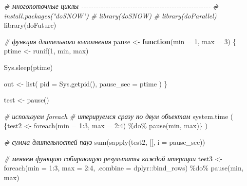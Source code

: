 \documentclass[
]{book}
\newenvironment{Shaded}{\begin{snugshade}}{\end{snugshade}}
\newcommand{\AttributeTok}[1]{\textcolor[rgb]{0.77,0.63,0.00}{#1}}
\newcommand{\CommentTok}[1]{\textcolor[rgb]{0.56,0.35,0.01}{\textit{#1}}}
\newcommand{\ControlFlowTok}[1]{\textcolor[rgb]{0.13,0.29,0.53}{\textbf{#1}}}
\newcommand{\DecValTok}[1]{\textcolor[rgb]{0.00,0.00,0.81}{#1}}
\newcommand{\FunctionTok}[1]{\textcolor[rgb]{0.00,0.00,0.00}{#1}}
\newcommand{\NormalTok}[1]{#1}
\newcommand{\OtherTok}[1]{\textcolor[rgb]{0.56,0.35,0.01}{#1}}
\newcommand{\SpecialCharTok}[1]{\textcolor[rgb]{0.00,0.00,0.00}{#1}}
\newcommand{\StringTok}[1]{\textcolor[rgb]{0.31,0.60,0.02}{#1}}
\begin{document}
\begin{Shaded}
\begin{Highlighting}[]
\CommentTok{\# многопоточные циклы {-}{-}{-}{-}{-}{-}{-}{-}{-}{-}{-}{-}{-}{-}{-}{-}{-}{-}{-}{-}{-}{-}{-}{-}{-}{-}{-}{-}{-}{-}{-}{-}{-}{-}{-}{-}{-}{-}{-}{-}{-}{-}{-}{-}{-}{-}{-}{-}{-}{-}{-}{-}{-}}
\CommentTok{\# install.packages("doSNOW")}
\CommentTok{\# library(doSNOW)}
\CommentTok{\# library(doParallel)}
\FunctionTok{library}\NormalTok{(doFuture)}

\CommentTok{\# функция длительного выполнения}
\NormalTok{pause }\OtherTok{\textless{}{-}} \ControlFlowTok{function}\NormalTok{(}\AttributeTok{min =} \DecValTok{1}\NormalTok{, }\AttributeTok{max =} \DecValTok{3}\NormalTok{) \{}
\NormalTok{  ptime }\OtherTok{\textless{}{-}} \FunctionTok{runif}\NormalTok{(}\DecValTok{1}\NormalTok{, min, max)}

  \FunctionTok{Sys.sleep}\NormalTok{(ptime)}

\NormalTok{  out }\OtherTok{\textless{}{-}} \FunctionTok{list}\NormalTok{(}
    \AttributeTok{pid =} \FunctionTok{Sys.getpid}\NormalTok{(),}
    \AttributeTok{pause\_sec =}\NormalTok{ ptime}
\NormalTok{  )}
\NormalTok{\}}

\NormalTok{test }\OtherTok{\textless{}{-}} \FunctionTok{pause}\NormalTok{()}

\CommentTok{\# используем foreach }
\CommentTok{\# итерируемся сразу по двум объектам}
\FunctionTok{system.time}\NormalTok{ (}
\NormalTok{  \{test2 }\OtherTok{\textless{}{-}} \FunctionTok{foreach}\NormalTok{(}\AttributeTok{min =} \DecValTok{1}\SpecialCharTok{:}\DecValTok{3}\NormalTok{, }\AttributeTok{max =} \DecValTok{2}\SpecialCharTok{:}\DecValTok{4}\NormalTok{) }\SpecialCharTok{\%do\%} \FunctionTok{pause}\NormalTok{(min, max)\}}
\NormalTok{)}

\CommentTok{\# сумма длительностей пауз}
\FunctionTok{sum}\NormalTok{(}\FunctionTok{sapply}\NormalTok{(test2, }\StringTok{\textquotesingle{}[[\textquotesingle{}}\NormalTok{, }\AttributeTok{i =} \StringTok{\textquotesingle{}pause\_sec\textquotesingle{}}\NormalTok{))}

\CommentTok{\# меняем функцию собирающую результаты каждой итерации}
\NormalTok{test3 }\OtherTok{\textless{}{-}} \FunctionTok{foreach}\NormalTok{(}\AttributeTok{min =} \DecValTok{1}\SpecialCharTok{:}\DecValTok{3}\NormalTok{, }\AttributeTok{max =} \DecValTok{2}\SpecialCharTok{:}\DecValTok{4}\NormalTok{, }\AttributeTok{.combine =}\NormalTok{ dplyr}\SpecialCharTok{::}\NormalTok{bind\_rows) }\SpecialCharTok{\%do\%} \FunctionTok{pause}\NormalTok{(min, max)}


\end{Highlighting}
\end{Shaded}
\end{document}
